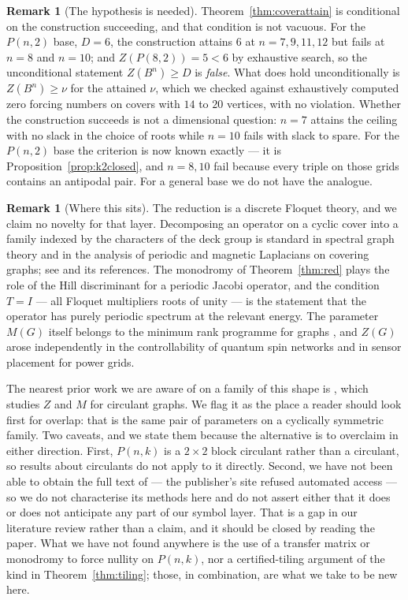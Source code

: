 \documentclass[11pt]{article}
\theoremstyle{definition}
\newtheorem{remark}[theorem]{Remark}
\begin{document}
\begin{remark}[The hypothesis is needed]
Theorem~\ref{thm:coverattain} is conditional on the construction succeeding,
and that condition is not vacuous. For the $P(n,2)$ base, $D=6$, the
construction attains $6$ at $n=7,9,11,12$ but fails at $n=8$ and $n=10$; and
$Z(P(8,2))=5<6$ by exhaustive search, so the unconditional statement
$Z(B^n)\ge D$ is \emph{false}. What does hold unconditionally is
$Z(B^n)\ge\nu$ for the attained $\nu$, which we checked against exhaustively
computed zero forcing numbers on covers with $14$ to $20$ vertices, with no
violation. Whether the construction succeeds is not a dimensional question:
$n=7$ attains the ceiling with no slack in the choice of roots while $n=10$
fails with slack to spare. For the $P(n,2)$ base the criterion is now known
exactly --- it is Proposition~\ref{prop:k2closed}, and $n=8,10$ fail because
every triple on those grids contains an antipodal pair. For a general base we
do not have the analogue.
\end{remark}

\begin{remark}[Where this sits]
The reduction is a discrete Floquet theory, and we claim no novelty for that
layer. Decomposing an operator on a cyclic cover into a family indexed by the
characters of the deck group is standard in spectral graph theory and in the
analysis of periodic and magnetic Laplacians on covering graphs; see
\cite{FL} and its references. The monodromy of
Theorem~\ref{thm:red} plays the role of the Hill discriminant for a periodic
Jacobi operator, and the condition $T=I$ --- all Floquet multipliers roots of
unity --- is the statement that the operator has purely periodic spectrum at the
relevant energy. The parameter $M(G)$ itself belongs to the minimum rank
programme for graphs \cite{AIM,FH}, and $Z(G)$ arose independently in the
controllability of quantum spin networks and in sensor placement for power
grids.

The nearest prior work we are aware of on a family of this shape is
\cite{circ}, which studies $Z$ and $M$ for circulant graphs. We flag it as the
place a reader should look first for overlap: that is the same pair of
parameters on a cyclically symmetric family. Two caveats, and we state them
because the alternative is to overclaim in either direction. First, $P(n,k)$ is
a $2\times2$ block circulant rather than a circulant, so results about
circulants do not apply to it directly. Second, we have not been able to obtain
the full text of \cite{circ} --- the publisher's site refused automated access
--- so we do not characterise its methods here and do not assert either that it
does or does not anticipate any part of our symbol layer. That is a gap in our
literature review rather than a claim, and it should be closed by reading the
paper. What we have not found anywhere is the use of a transfer matrix or
monodromy to force nullity on $P(n,k)$, nor a certified-tiling argument of the
kind in Theorem~\ref{thm:tiling}; those, in combination, are what we take to be
new here.
\end{remark}
\end{document}
